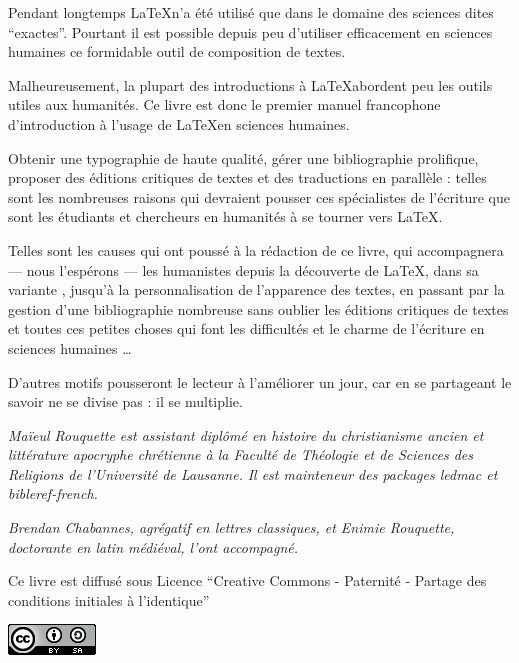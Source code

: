 \thispagestyle{empty}

Pendant longtemps \LaTeX n'a été utilisé que dans le domaine des sciences dites \enquote{exactes}.
Pourtant il est possible depuis peu d'utiliser efficacement en sciences humaines ce formidable outil de composition de textes.

Malheureusement, la plupart des introductions à \LaTeX abordent peu les outils utiles aux humanités. Ce livre est donc le premier manuel francophone d'introduction à l'usage de \LaTeX en sciences humaines.

Obtenir une typographie de haute qualité, gérer une bibliographie prolifique, proposer des éditions critiques de textes et des traductions en parallèle : telles sont les nombreuses raisons qui devraient pousser ces spécialistes de l'écriture que sont les étudiants et chercheurs en humanités à se tourner vers \LaTeX.

Telles sont les causes qui ont poussé à la rédaction de ce livre, qui accompagnera --- nous l'espérons --- les humanistes depuis la découverte de \LaTeX, dans sa variante \XeLaTeX, jusqu'à la personnalisation de l'apparence des textes, en passant par la gestion d'une bibliographie nombreuse sans oublier les éditions critiques de textes et toutes ces petites choses qui font les difficultés et le charme de l'écriture en sciences humaines \ldots

D'autres motifs pousseront le lecteur à l'améliorer un jour, car en se partageant le savoir ne se divise pas : il se multiplie.

\vspace{4ex}

\scriptsize
\emph{
Maïeul Rouquette est assistant diplômé en histoire du christianisme ancien et littérature apocryphe chrétienne à la Faculté de Théologie et de Sciences des Religions de l'Université de Lausanne.} 
\emph{Il est mainteneur des packages \emph{ledmac} et \emph{bibleref-french}.}


\emph{Brendan Chabannes, agrégatif en lettres classiques, et Enimie Rouquette, doctorante en latin médiéval, l'ont accompagné.}

\normalsize

\vspace{4ex}
Ce livre est diffusé sous Licence \enquote{Creative Commons - Paternité - Partage des conditions initiales à l'identique}

\vspace{2ex}
 \raggedleft\includegraphics[height=3ex]{images/cc.png}
